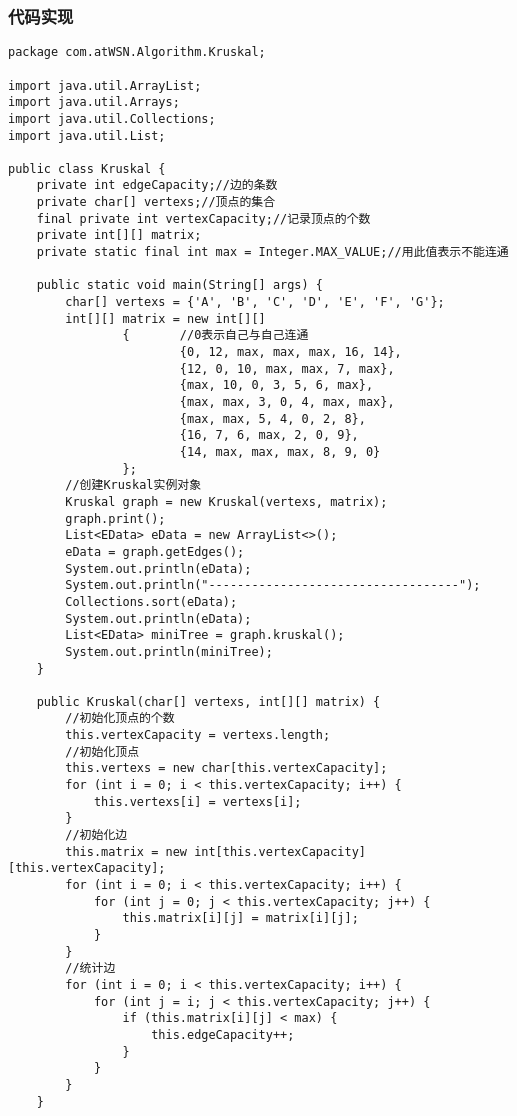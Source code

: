 \documentclass[a4paper]{report}
\begin{document}
\subsubsection{代码实现}
\begin{lstlisting}
package com.atWSN.Algorithm.Kruskal;

import java.util.ArrayList;
import java.util.Arrays;
import java.util.Collections;
import java.util.List;

public class Kruskal {
    private int edgeCapacity;//边的条数
    private char[] vertexs;//顶点的集合
    final private int vertexCapacity;//记录顶点的个数
    private int[][] matrix;
    private static final int max = Integer.MAX_VALUE;//用此值表示不能连通

    public static void main(String[] args) {
        char[] vertexs = {'A', 'B', 'C', 'D', 'E', 'F', 'G'};
        int[][] matrix = new int[][]
                {       //0表示自己与自己连通
                        {0, 12, max, max, max, 16, 14},
                        {12, 0, 10, max, max, 7, max},
                        {max, 10, 0, 3, 5, 6, max},
                        {max, max, 3, 0, 4, max, max},
                        {max, max, 5, 4, 0, 2, 8},
                        {16, 7, 6, max, 2, 0, 9},
                        {14, max, max, max, 8, 9, 0}
                };
        //创建Kruskal实例对象
        Kruskal graph = new Kruskal(vertexs, matrix);
        graph.print();
        List<EData> eData = new ArrayList<>();
        eData = graph.getEdges();
        System.out.println(eData);
        System.out.println("-----------------------------------");
        Collections.sort(eData);
        System.out.println(eData);
        List<EData> miniTree = graph.kruskal();
        System.out.println(miniTree);
    }

    public Kruskal(char[] vertexs, int[][] matrix) {
        //初始化顶点的个数
        this.vertexCapacity = vertexs.length;
        //初始化顶点
        this.vertexs = new char[this.vertexCapacity];
        for (int i = 0; i < this.vertexCapacity; i++) {
            this.vertexs[i] = vertexs[i];
        }
        //初始化边
        this.matrix = new int[this.vertexCapacity][this.vertexCapacity];
        for (int i = 0; i < this.vertexCapacity; i++) {
            for (int j = 0; j < this.vertexCapacity; j++) {
                this.matrix[i][j] = matrix[i][j];
            }
        }
        //统计边
        for (int i = 0; i < this.vertexCapacity; i++) {
            for (int j = i; j < this.vertexCapacity; j++) {
                if (this.matrix[i][j] < max) {
                    this.edgeCapacity++;
                }
            }
        }
    }


\end{lstlisting}
\end{document}
